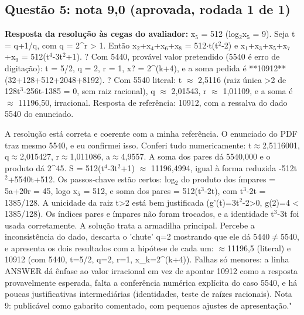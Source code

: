 \documentclass{article}%
\begin{document}
\subsection*{Questão 5: nota 9,0 (aprovada, rodada 1 de 1)}%
\textbf{Resposta da resolução às cegas do avaliador:} x$_{5}$ = 512 (log$_{2}$x$_{5}$ = 9). Seja t = q+1/q, com q = 2\^{}r > 1. Então x$_{2}$+x$_{4}$+x$_{6}$+x$_{8}$ = 512$\cdot$t(t$^2$-2) e x$_{1}$+x$_{3}$+x$_{5}$+x$_{7}$+x$_{9}$ = 512(t$^{4}$-3t$^2$+1).\newline%
? Com 5440, provável valor pretendido (5540 é erro de digitação): t = 5/2, q = 2, r = 1, x? = 2\^{}(k+4), e a soma pedida é **10912** (32+128+512+2048+8192).\newline%
? Com 5540 literal: t $\approx$ 2,5116 (raiz única >2 de 128t$^3$-256t-1385 = 0, sem raiz racional), q $\approx$ 2,01543, r $\approx$ 1,01109, e a soma é $\approx$ 11196,50, irracional.\newline%
Resposta de referência: 10912, com a ressalva do dado 5540 do enunciado.\par %
A resolução está correta e coerente com a minha referência. O enunciado do PDF traz mesmo 5540, e eu confirmei isso. Conferi tudo numericamente: t$\approx$2,5116001, q$\approx$2,015427, r$\approx$1,011086, a$\approx$4,9557. A soma dos pares dá 5540,000 e o produto dá 2\^{}45. S = 512(t$^{4}$-3t$^2$+1) $\approx$ 11196,4994, igual à forma reduzida -512t$^2$+5540t+512. Os passos{-}chave estão certos: log$_{2}$ do produto dos ímpares = 5a+20r = 45, logo x$_{5}$ = 512, e soma dos pares = 512(t$^3$-2t), com t$^3$-2t = 1385/128. A unicidade da raiz t>2 está bem justificada (g'(t)=3t$^2$-2>0, g(2)=4 < 1385/128). Os índices pares e ímpares não foram trocados, e a identidade t$^3$-3t foi usada corretamente. A solução trata a armadilha principal. Percebe a inconsistência do dado, descarta o 'chute' q=2 mostrando que ele dá 5440$\neq$5540, e apresenta os dois resultados com a hipótese de cada um: $\approx$11196,5 (literal) e 10912 (com 5440, t=5/2, q=2, r=1, x\_k=2\^{}(k+4)). Falhas só menores: a linha ANSWER dá ênfase ao valor irracional em vez de apontar 10912 como a resposta provavelmente esperada, falta a conferência numérica explícita do caso 5540, e há poucas justificativas intermediárias (identidades, teste de raízes racionais). Nota 9: publicável como gabarito comentado, com pequenos ajustes de apresentação."%
\end{document}
